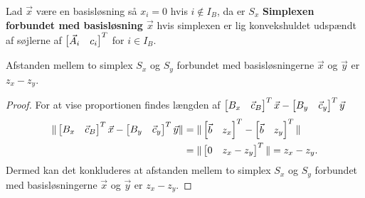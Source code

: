 \begin{defn}
Lad $\vec{x}$ være en basisløsning så $x_i = 0$ hvis $i \notin I_B$, da er $S_x$ \textbf{Simplexen forbundet med basisløsning $\vec{x}$} hvis simplexen er lig konvekshuldet udspændt af søjlerne af $\begin{bmatrix} \vec{A}_i & c_i \end{bmatrix}^T$ for $i \in I_B$.
\end{defn}

\begin{prop}
Afstanden mellem to simplex $S_x$ og $S_y$ forbundet med basisløsningerne $\vec{x}$ og $\vec{y}$ er $z_x - z_y$.
\end{prop}

\begin{proof}
For at vise proportionen findes længden af $\begin{bmatrix} B_x & \vec{c}_B \end{bmatrix}^T \vec{x} - \begin{bmatrix} B_y & \vec{c}_y \end{bmatrix}^T \vec{y}$
\begin{align*}
 \Vert \begin{bmatrix} B_x & \vec{c}_B \end{bmatrix}^T \vec{x} - \begin{bmatrix} B_y & \vec{c}_y \end{bmatrix}^T \vec{y} \Vert & =  \Vert \begin{bmatrix} \vec{b} & z_x \end{bmatrix}^T  - \begin{bmatrix} \vec{b} & z_y \end{bmatrix}^T  \Vert
 \\ & = \Vert \begin{bmatrix} 0 & z_x - z_y \end{bmatrix}^T \Vert = z_x - z_y.
\end{align*}
Dermed kan det konkluderes at afstanden mellem to simplex $S_x$ og $S_y$ forbundet med basisløsningerne $\vec{x}$ og $\vec{y}$ er $z_x - z_y$.
\end{proof}

